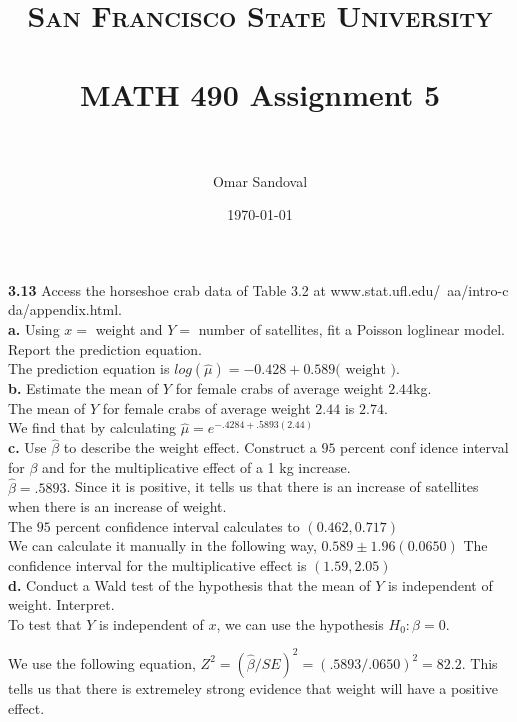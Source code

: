 \documentclass[paper=letter, fontsize=11pt]{scrartcl} %
\title{	
\normalfont \normalsize 
\textsc{San Francisco State University} \\ [25pt]
\horrule{0.5pt} \\[0.4cm] %
\huge MATH 490 Assignment 5  \\ %
\horrule{2pt} \\[0.5cm] %
}
\author{Omar Sandoval}
\date{\normalsize\today}
\begin{document}
\maketitle

\textbf{3.13} Access the horseshoe crab data of Table 3.2 at www.stat.ufl.edu/~aa/intro-c
da/appendix.html. \\
\textbf{a.} Using $x =$ weight and $Y =$ number of satellites, fit a Poisson loglinear
model. Report the prediction equation. \\

The prediction equation is $log(\hat{\mu}) = -0.428 + 0.589 \text{( weight )}$.
\\

\textbf{b.} Estimate the mean of $Y$ for female crabs of average weight $2.44$kg. \\

The mean of $Y$ for female crabs of average weight $2.44$ is $2.74$. \\
We find that by calculating $\hat{\mu} = e^{-.4284+.5893(2.44)}$
\\

\textbf{c.} Use $\hat{\beta}$ to describe the weight effect. Construct a $95$ percent conf
idence interval for $\beta$ and for the multiplicative effect of a 1 kg increase. \\

$\hat{\beta} = .5893$. Since it is positive, it tells us that there is an increase 
of satellites when there is an increase of weight. \\

The $95$ percent confidence interval calculates to $(0.462, 0.717)$ \\
We can calculate it manually in the following way, $0.589 \pm 1.96(0.0650)$
The confidence interval for the multiplicative effect is $(1.59, 2.05)$ \\

\textbf{d.} Conduct a Wald test of the hypothesis that the mean of $Y$ is independent of 
weight. Interpret. \\

To test that $Y$ is independent of $x$, we can use the hypothesis $H_0 : \beta = 0$.

We use the following equation, $Z^2 = (\hat{\beta}/SE)^2 = (.5893/.0650)^2 = 82.2$.
This tells us that there is extremeley strong evidence that weight will have a positive 
effect. \\
\end{document}
